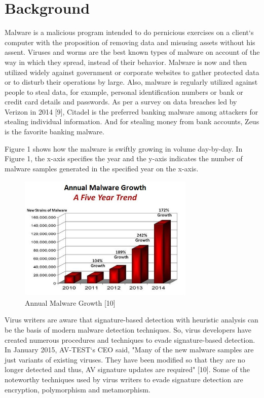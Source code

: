\chapter{Background}

Malware is a malicious program intended to do pernicious exercises on a client`s computer with the proposition of removing data and misusing assets without his assent. Viruses and worms are the best known types of malware on account of the way in which they spread, instead of their behavior. Malware is now and then utilized widely against government or corporate websites to gather protected data or to disturb their operations by large. Also, malware is regularly utilized against people to steal data, for example, personal identification numbers or bank or credit card details and passwords. As per a survey on data breaches led by Verizon in 2014 [9], Citadel is the preferred banking malware among attackers for stealing individual information. And for stealing money from bank accounts, Zeus is the favorite banking malware.

Figure 1 shows how the malware is swiftly growing in volume day-by-day. In Figure 1, the x-axis specifies the year and the y-axis indicates the number of malware samples generated in the specified year on the x-axis.

\begin{figure}
    \centering    
    \includegraphics[width=8.4cm, height=6cm]{malware-growth-chart.jpg}
    \caption[Annual Malware Growth]{Annual Malware Growth [10]}
\end{figure}
Virus writers are aware that signature-based detection with heuristic analysis can be the basis of modern malware detection techniques. So, virus developers have created numerous procedures and techniques to evade signature-based detection. In January 2015, AV-TEST`s CEO said, "Many of the new malware samples are just variants of existing viruses. They have been modified so that they are no longer detected and thus, AV signature updates are required" [10]. Some of the noteworthy techniques used by virus writers to evade signature detection are encryption, polymorphism and metamorphism.

